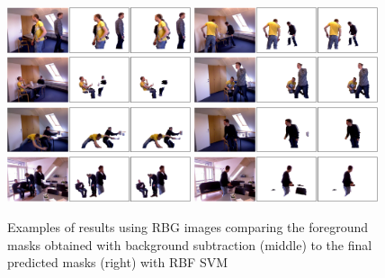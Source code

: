 \documentclass[10pt,twocolumn,letterpaper]{article}
\begin{document}
\begin{figure}[htbp]
	\centering
		\includegraphics[width=0.48\textwidth]{results1.eps}
		\includegraphics[width=0.48\textwidth]{results2.eps}
		\includegraphics[width=0.48\textwidth]{results3.eps}
		\includegraphics[width=0.48\textwidth]{results4.eps}
		\includegraphics[width=0.48\textwidth]{results5.eps}
		\includegraphics[width=0.48\textwidth]{results6.eps}
		\includegraphics[width=0.48\textwidth]{results7.eps}
		\includegraphics[width=0.48\textwidth]{results8.eps}
	\caption{Examples of results using RBG images comparing the foreground masks obtained with background subtraction (middle) to the final predicted masks (right) with RBF SVM}
	\label{fig:results}
\end{figure}
\end{document}
